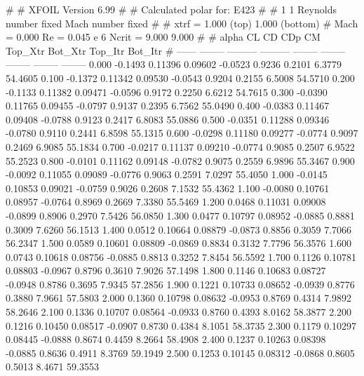 #  
#       XFOIL         Version 6.99
#  
# Calculated polar for: E423                                            
#  
# 1 1 Reynolds number fixed          Mach number fixed         
#  
# xtrf =   1.000 (top)        1.000 (bottom)  
# Mach =   0.000     Re =     0.045 e 6     Ncrit =   9.000  9.000
#  
#   alpha    CL        CD       CDp       CM     Top_Xtr  Bot_Xtr  Top_Itr  Bot_Itr
#  ------ -------- --------- --------- -------- -------- -------- -------- --------
   0.000  -0.1493   0.11396   0.09602  -0.0523   0.9236   0.2101   6.3779  54.4605
   0.100  -0.1372   0.11342   0.09530  -0.0543   0.9204   0.2155   6.5008  54.5710
   0.200  -0.1133   0.11382   0.09471  -0.0596   0.9172   0.2250   6.6212  54.7615
   0.300  -0.0390   0.11765   0.09455  -0.0797   0.9137   0.2395   6.7562  55.0490
   0.400  -0.0383   0.11467   0.09408  -0.0788   0.9123   0.2417   6.8083  55.0886
   0.500  -0.0351   0.11288   0.09346  -0.0780   0.9110   0.2441   6.8598  55.1315
   0.600  -0.0298   0.11180   0.09277  -0.0774   0.9097   0.2469   6.9085  55.1834
   0.700  -0.0217   0.11137   0.09210  -0.0774   0.9085   0.2507   6.9522  55.2523
   0.800  -0.0101   0.11162   0.09148  -0.0782   0.9075   0.2559   6.9896  55.3467
   0.900  -0.0092   0.11055   0.09089  -0.0776   0.9063   0.2591   7.0297  55.4050
   1.000  -0.0145   0.10853   0.09021  -0.0759   0.9026   0.2608   7.1532  55.4362
   1.100  -0.0080   0.10761   0.08957  -0.0764   0.8969   0.2669   7.3380  55.5469
   1.200   0.0468   0.11031   0.09008  -0.0899   0.8906   0.2970   7.5426  56.0850
   1.300   0.0477   0.10797   0.08952  -0.0885   0.8881   0.3009   7.6260  56.1513
   1.400   0.0512   0.10664   0.08879  -0.0873   0.8856   0.3059   7.7066  56.2347
   1.500   0.0589   0.10601   0.08809  -0.0869   0.8834   0.3132   7.7796  56.3576
   1.600   0.0743   0.10618   0.08756  -0.0885   0.8813   0.3252   7.8454  56.5592
   1.700   0.1126   0.10781   0.08803  -0.0967   0.8796   0.3610   7.9026  57.1498
   1.800   0.1146   0.10683   0.08727  -0.0948   0.8786   0.3695   7.9345  57.2856
   1.900   0.1221   0.10733   0.08652  -0.0939   0.8776   0.3880   7.9661  57.5803
   2.000   0.1360   0.10798   0.08632  -0.0953   0.8769   0.4314   7.9892  58.2646
   2.100   0.1336   0.10707   0.08564  -0.0933   0.8760   0.4393   8.0162  58.3877
   2.200   0.1216   0.10450   0.08517  -0.0907   0.8730   0.4384   8.1051  58.3735
   2.300   0.1179   0.10297   0.08445  -0.0888   0.8674   0.4459   8.2664  58.4908
   2.400   0.1237   0.10263   0.08398  -0.0885   0.8636   0.4911   8.3769  59.1949
   2.500   0.1253   0.10145   0.08312  -0.0868   0.8605   0.5013   8.4671  59.3553
